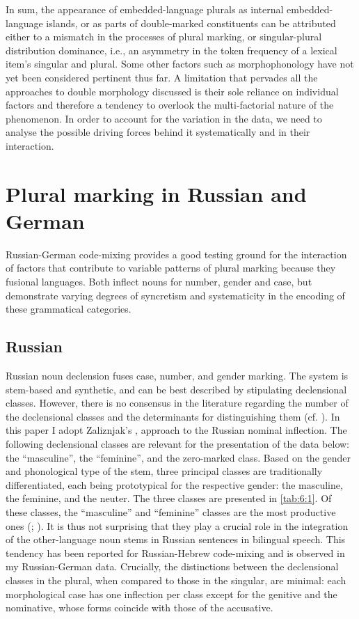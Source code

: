 In sum, the appearance of embedded-language plurals as internal embedded-language islands, or as parts of double-marked constituents can be attributed either to a mismatch in the processes of plural marking, or singular-plural distribution dominance, i.e., an asymmetry in the token frequency of a lexical item’s singular and plural. Some other factors such as morphophonology have not yet been considered pertinent thus far. A limitation that pervades all the approaches to double morphology discussed is their sole reliance on individual factors and therefore a tendency to overlook the multi-factorial nature of the phenomenon. In order to account for the variation in the data, we need to analyse the possible driving forces behind it systematically and in their interaction.

\section{Plural marking in Russian and German}

Russian-German code-mixing provides a good testing ground for the interaction of factors that contribute to variable patterns of plural marking because they fusional languages. Both inflect nouns for number, gender and case, but demonstrate varying degrees of syncretism and systematicity in the encoding of these grammatical categories.

\subsection{Russian}

Russian noun declension fuses case, number, and gender marking. The system is stem-based and synthetic, and can be best described by stipulating declensional classes. However, there is no consensus in the literature regarding the number of the declensional classes and the determinants for distinguishing them (cf. \citealt{corbett91,corbett03}). In this paper I adopt Zaliznjak's \citeyear{zaliznjak02}, \citeyear{zaliznjak09} approach to the Russian nominal inflection. The following declensional classes are relevant for the presentation of the data below: the “masculine”, the “feminine”, and the zero-marked class. Based on the gender and phonological type of the stem, three principal classes are traditionally differentiated, each being prototypical for the respective gender: the masculine, the feminine, and the neuter. The three classes are presented in \ref{tab:6:1}. Of these classes, the “masculine” and “feminine” classes are the most productive ones (\citealt[218]{zaliznjak02}; \citealt[148]{timberlake04}). It is thus not surprising that they play a crucial role in the integration of the other-language noun stems in Russian sentences in bilingual speech. This tendency has been reported for Russian-Hebrew code-mixing \citep{naiditch08} and is observed in my Russian-German data. Crucially, the distinctions between the declensional classes in the plural, when compared to those in the singular, are minimal: each morphological case has one inflection per class except for the genitive and the nominative, whose forms coincide with those of the accusative.

